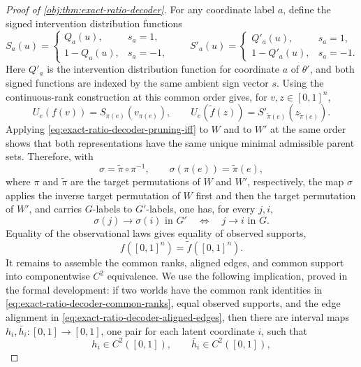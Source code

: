 \begin{proof}[Proof of \cref{obj:thm:exact-ratio-decoder}]
For any coordinate label \(a\), define the signed intervention distribution functions
\[
S_a(u)=
\begin{cases}
Q_a(u), & s_a=1,\\
1-Q_a(u), & s_a=-1,
\end{cases}
\qquad
S'_a(u)=
\begin{cases}
Q'_a(u), & s_a=1,\\
1-Q'_a(u), & s_a=-1.
\end{cases}
\]
Here \(Q'_a\) is the intervention distribution function for coordinate \(a\) of \(\theta'\), and both signed functions are indexed by the same ambient sign vector \(s\). Using the continuous-rank construction at this common order gives, for \(v,z\in[0,1]^n\),
\begin{equation}
U_e(f(v))=S_{\pi(e)}(v_{\pi(e)}),
\qquad
U_e(\widetilde f(z))=S'_{\widetilde\pi(e)}(z_{\widetilde\pi(e)}).
\label{eq:exact-ratio-decoder-common-ranks}
\end{equation} Applying \cref{eq:exact-ratio-decoder-pruning-iff} to \(W\) and to \(W'\) at the same order shows that both representations have the same unique minimal admissible parent sets. Therefore, with
\[
\sigma=\widetilde\pi\circ\pi^{-1},
\qquad
\sigma(\pi(e))=\widetilde\pi(e),
\]
where \(\pi\) and \(\widetilde\pi\) are the target permutations of \(W\) and \(W'\), respectively, the map \(\sigma\) applies the inverse target permutation of \(W\) first and then the target permutation of \(W'\), and carries \(G\)-labels to \(G'\)-labels, one has, for every \(j,i\),
\begin{equation}
\sigma(j)\to\sigma(i)\text{ in }G'
\quad\Longleftrightarrow\quad
j\to i\text{ in }G.
\label{eq:exact-ratio-decoder-aligned-edges}
\end{equation}
Equality of the observational laws gives equality of observed supports,
\begin{equation}
f([0,1]^n)=\widetilde f([0,1]^n).
\label{eq:exact-ratio-decoder-common-support}
\end{equation}
It remains to assemble the common ranks, aligned edges, and common support into componentwise \(C^2\) equivalence. We use the following implication, proved in the formal development: if two worlds have the common rank identities in \cref{eq:exact-ratio-decoder-common-ranks}, equal observed supports, and the edge alignment in \cref{eq:exact-ratio-decoder-aligned-edges}, then there are interval maps \(h_i,\bar h_i:[0,1]\to[0,1]\), one pair for each latent coordinate \(i\), such that
\[
h_i\in C^2([0,1]),
\qquad
\bar h_i\in C^2([0,1]),
\]
\end{proof}
